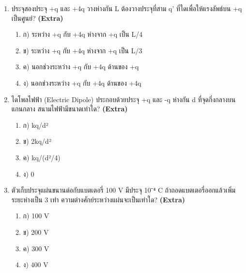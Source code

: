 \documentclass[12pt]{article}
\begin{document}
\begin{enumerate}[label=\arabic*.]
\item ประจุสองประจุ +q และ +4q วางห่างกัน L ต้องวางประจุที่สาม q' ที่ใดเพื่อให้แรงลัพธ์บน +q เป็นศูนย์? \hfill \textbf{\small (Extra)}
\begin{enumerate}[label=)]
\item ก) ระหว่าง +q กับ +4q ห่างจาก +q เป็น L/4
\item ข) ระหว่าง +q กับ +4q ห่างจาก +q เป็น L/3
\item ค) นอกช่วงระหว่าง +q กับ +4q ด้านของ +q
\item ง) นอกช่วงระหว่าง +q กับ +4q ด้านของ +4q
\end{enumerate}
\item ไดโพลไฟฟ้า (Electric Dipole) ประกอบด้วยประจุ +q และ -q ห่างกัน d ที่จุดกึ่งกลางบนแกนกลาง สนามไฟฟ้ามีขนาดเท่าใด? \hfill \textbf{\small (Extra)}
\begin{enumerate}[label=)]
\item ก) kq/d²
\item ข) 2kq/d²
\item ค) kq/(d²/4)
\item ง) 0
\end{enumerate}
\item ตัวเก็บประจุแผ่นขนานต่อกับแบตเตอรี่ 100 V มีประจุ 10⁻⁴ C ถ้าถอดแบตเตอรี่ออกแล้วเพิ่มระยะห่างเป็น 3 เท่า ความต่างศักย์ระหว่างแผ่นจะเป็นเท่าใด? \hfill \textbf{\small (Extra)}
\begin{enumerate}[label=)]
\item ก) 100 V
\item ข) 200 V
\item ค) 300 V
\item ง) 400 V
\end{enumerate}
\end{enumerate}
\end{document}
